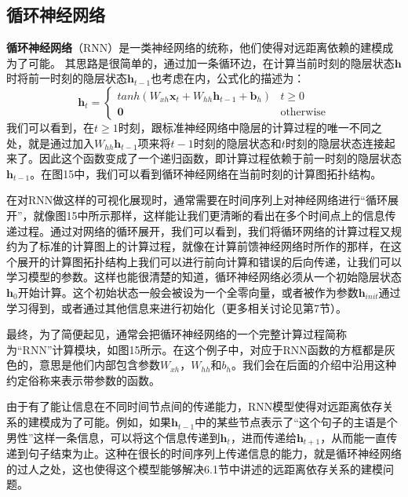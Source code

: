 \documentclass[10pt,a4paper]{ctexart}
\begin{document}
\subsection{循环神经网络}
\textbf{循环神经网络}（RNN）是一类神经网络的统称，他们使得对远距离依赖的建模成为了可能。
其思路是很简单的，通过加一条循环边，在计算当前时刻的隐层状态$\textbf{h}$时将前一时刻的隐层状态$\textbf{h}_{t-1}$也考虑在内，公式化的描述为：
\[
 \textbf{h}_t = \left\{ \begin{array}{ll}
  tanh(W_{xh}\textbf{x}_t + W_{hh}\textbf{h}_{t-1}+\textbf{b}_h) & t \geq 0 \\
  \textbf{0} & \textrm{otherwise}
  \end{array} \right.
\]
我们可以看到，在$t \geq 1$时刻，跟标准神经网络中隐层的计算过程的唯一不同之处，就是通过加入$W_{hh}\textbf{h}_{t-1}$项来将$t-1$时刻的隐层状态和$t$时刻的隐层状态连接起来了。因此这个函数变成了一个递归函数，即计算过程依赖于前一时刻的隐层状态$\textbf{h}_{t-1}$。在图15中，我们可以看到循环神经网络在当前时刻的计算图拓扑结构。

在对RNN做这样的可视化展现时，通常需要在时间序列上对神经网络进行“循环展开”，就像图15中所示那样，这样能让我们更清晰的看出在多个时间点上的信息传递过程。通过对网络的循环展开，我们可以看到，我们将循环网络的计算过程又规约为了标准的计算图上的计算过程，就像在计算前馈神经网络时所作的那样，在这个展开的计算图拓扑结构上我们可以进行前向计算和错误的后向传递，让我们可以学习模型的参数。这样也能很清楚的知道，循环神经网络必须从一个初始隐层状态$\textbf{h}_0$开始计算。这个初始状态一般会被设为一个全零向量，或者被作为参数$\textbf{h}_{init}$通过学习得到，或者通过其他信息来进行初始化（更多相关讨论见第7节）。

最终，为了简便起见，通常会把循环神经网络的一个完整计算过程简称为“RNN”计算模块，如图15所示。在这个例子中，对应于RNN函数的方框都是灰色的，意思是他们内部包含参数$W_{xh}$，$W_{hh}$和$b_h$。我们会在后面的介绍中沿用这种约定俗称来表示带参数的函数。

由于有了能让信息在不同时间节点间的传递能力，RNN模型使得对远距离依存关系的建模成为了可能。例如，如果$\textbf{h}_{t-1}$中的某些节点表示了“这个句子的主语是个男性”这样一条信息，可以将这个信息传递到$\textbf{h}_t$，进而传递给$\textbf{h}_{t+1}$，从而能一直传递到句子结束为止。这种在很长的时间序列上传递信息的能力，就是循环神经网络的过人之处，这也使得这个模型能够解决6.1节中讲述的远距离依存关系的建模问题。
\end{document}
